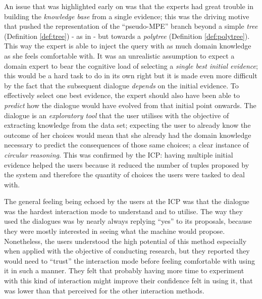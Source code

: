 An issue that was highlighted early on was that the experts had great trouble in building the \textit{knowledge base} from a single evidence; this was the driving motive that pushed the representation of the \enquote{pseudo-MPE} branch beyond a simple \textit{tree} (Definition \ref{def:tree}) - as in \citep{Butz2018} - but towards a \textit{polytree} (Definition \ref{def:polytree}).
This way the expert is able to inject the query with as much domain knowledge as she feels comfortable with.
It was an unrealistic assumption to expect a domain expert to bear the cognitive load of selecting a \textit{single best initial evidence}; this would be a hard task to do in its own right but it is made even more difficult by the fact that the subsequent dialogue \textit{depends} on the initial evidence.
To effectively select one best evidence, the expert should also have been able to \textit{predict} how the dialogue would have evolved from that initial point onwards.
The dialogue is an \textit{exploratory tool} that the user utilises with the objective of extracting knowledge from the data set; expecting the user to already know the outcome of her choices would mean that she already had the domain knowledge necessary to predict the consequences of those same choices; a clear instance of \textit{circular reasoning}.
This was confirmed by the ICP: having multiple initial evidence helped the users because it reduced the number of tuples proposed by the system and therefore the quantity of choices the users were tasked to deal with.

The general feeling being echoed by the users at the ICP was that the dialogue was the hardest interaction mode to understand and to utilise.
The way they used the dialogues was by nearly always replying \enquote{yes} to its proposals, because they were mostly interested in seeing what the machine would propose.
Nonetheless, the users understood the high potential of this method especially when applied with the objective of conducting research, but they reported they would need to \enquote{trust} the interaction mode before feeling comfortable with using it in such a manner.
They felt that probably having more time to experiment with this kind of interaction might improve their confidence felt in using it, that was lower than that perceived for the other interaction methods.

